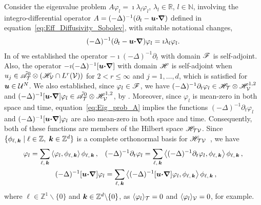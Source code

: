 \documentclass[amsa]{ipart}
\begin{document}
Consider the eigenvalue problem $A\varphi_l=\imath\lambda_l\varphi_l$,
$\lambda_l\in\mathbb{R}$, $l\in\mathbb{N}$, involving the integro-differential
operator $A=(-\Delta)^{-1}(\partial_t-\boldsymbol{u} \mbox{\boldmath${\cdot}$}\mbox{\boldmath${\nabla}$})$ defined in
equation~\eqref{eq:Eff_Diffusivity_Sobolev}, with suitable notational
changes, 
%
\begin{align}\label{eq:Eig_prob_A}
  (-\Delta)^{-1}(\partial_t-\vecu \bcdot\bnabla)\varphi_l=\imath\lambda_l\varphi_l.
\end{align}
%
In  of  we
established the operator $-\imath(-\Delta)^{-1}\partial_t$ with domain $\mathscr{F}$ is
self-adjoint. Also, the operator $-\imath(-\Delta)^{-1}[\boldsymbol{u}\mbox{\boldmath${\cdot}$}\mbox{\boldmath${\nabla}$}]$
with domain $\mathscr{H}$ is self-adjoint when
$u_j\in\tilde{\mathscr{A}}^0_{\mathcal{T}}\otimes(\mathscr{H}_{\mathcal{V}}\cap L^r(\mathcal{V}))$ for $2<r\leq\infty$ and
$j=1,\ldots,d$, which is
satisfied for $\boldsymbol{u}\in\mathcal{U}^N$. We also established, since
$\varphi_l\in\mathscr{F}$, we have 
$(-\Delta)^{-1}\partial_t\varphi_l\in\mathscr{H}_{\mathcal{T}}\otimes\mathscr{H}^{1,2}_{\mathcal{V}}$ and
$(-\Delta)^{-1}[\boldsymbol{u}\mbox{\boldmath${\cdot}$}\mbox{\boldmath${\nabla}$}]\varphi_l\in\tilde{\mathscr{A}}^0_{\mathcal{T}}\otimes\mathscr{H}^{1,2}_{\mathcal{V}}$,
by . Moreover,
since $\varphi_l$ is mean-zero in both space and time,
equation~\eqref{eq:Eig_prob_A} 
implies the functions $(-\Delta)^{-1}\partial_t\varphi_l$ 
and $(-\Delta)^{-1}[\boldsymbol{u}\mbox{\boldmath${\cdot}$}\mbox{\boldmath${\nabla}$}]\varphi_l$ are also mean-zero in both
space and time. Consequently, both of these functions are members of the
Hilbert space $\mathscr{H}_{\mathcal{T}\mathcal{V}}$. Since $\{\phi_{\ell,\,\boldsymbol{k}} \;|\;
\ell\in\mathbb{Z},\;\boldsymbol{k}\in\mathbb{Z}^d\}$ is a complete orthonormal basis
for $\mathscr{H}_{\mathcal{T}\mathcal{V}}$~\cite{Folland:99:RealAnalysis}, we have
% 
\begin{align}\label{eq:Fourier_Eig_fun}
  \varphi_l=\sum_{\ell,\,\veck}\left\langle\varphi_l,\phi_{\ell,\,\veck}\right\rangle\phi_{\ell,\,\veck}\,,
  \quad
  &(-\Delta)^{-1}\partial_t\varphi_l=\sum_{\ell,\,\veck}\left\langle(-\Delta)^{-1}\partial_t\varphi_l,\phi_{\ell,\,\veck}\right\rangle\phi_{\ell,\,\veck}\,,
  \\
  (-\Delta)^{-1}[\vecu\bcdot\bnabla]\varphi_l
  &=\sum_{\ell,\,\veck}
  \left\langle(-\Delta)^{-1}[\vecu\bcdot\bnabla]\varphi_l,\phi_{\ell,\,\veck}\right\rangle\phi_{\ell,\,\veck}\,,
  \notag
\end{align}
%
where $\ell\in\mathbb{Z}^1\backslash\{0\}$ and $\boldsymbol{k}\in\mathbb{Z}^d\backslash\{0\}$, as
$\langle\varphi_l\rangle_{\mathcal{T}}=0$ and $\langle\varphi_l\rangle_{\mathcal{V}}=0$, for example.
\end{document}
